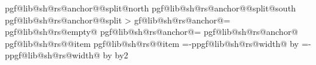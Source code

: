 {{{{{                            }%
                            \expandafter\addtosavedmacro\csname pgf@lib@sh@rs@anchor@\pgf@lib@sh@rs@number @split@north\endcsname%
                            \expandafter\addtosavedmacro\csname pgf@lib@sh@rs@anchor@\pgf@lib@sh@rs@number @split@south\endcsname%
                            \expandafter\addtosavedmacro\csname pgf@lib@sh@rs@anchor@\pgf@lib@sh@rs@number @split\endcsname%
                        \fi%
                    \fi%
            \repeatpgfmathloop%
        \else%
            \pgf@y=0pt\relax%
            \pgfmathloop%
                \ifnum\pgfmathcounter>\parts%
                \else%
                    \pgf@lib@sh@getalpha\pgf@lib@sh@rs@number{\pgfmathcounter}%
                    \expandafter\let\csname pgf@lib@sh@rs@anchor@\pgf@lib@sh@rs@number\endcsname=\pgfutil@empty%
                    \expandafter\ifx\csname pgf@lib@sh@rs@empty@\pgf@lib@sh@rs@number\endcsname\pgfutil@empty%
                        \ifpgfrectanglesplitignoreemptyparts%
                            \expandafter\let\csname pgf@lib@sh@rs@anchor@\pgf@lib@sh@rs@number\endcsname=%
                                \pgf@lib@sh@rs@lastanchor%
                        \fi%
                    \fi%
                    \expandafter\ifx\csname pgf@lib@sh@rs@anchor@\pgf@lib@sh@rs@number\endcsname\pgfutil@empty%
                        \expandafter\ifx\csname pgf@lib@sh@rs@\pgf@lib@sh@rs@number @item\endcsname%
                                \pgf@lib@sh@rs@lefttext%
                            \pgf@x=0pt\relax%
                        \else%
                            \expandafter\ifx\csname pgf@lib@sh@rs@\pgf@lib@sh@rs@number @item\endcsname%
                                    \pgf@lib@sh@rs@righttext%
                                \pgf@x=-\csname pgf@lib@sh@rs@width@\pgf@lib@sh@rs@number\endcsname\relax%
                                \advance\pgf@x by\pgf@lib@sh@rs@max@width\relax%
                            \else%
                                \pgf@x=-\csname pgf@lib@sh@rs@width@\pgf@lib@sh@rs@number\endcsname\relax%
                                \advance\pgf@x by\pgf@lib@sh@rs@max@width\relax%
                                \divide\pgf@x by2\relax%
                        \fi%
                    \fi%
                    \ifnum{}\relax%
}}}}
